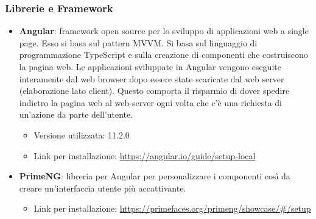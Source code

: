 \subsubsection{Librerie e Framework}

\begin{itemize}
	\item \textbf{Angular}: framework open source per lo sviluppo di applicazioni web a single page. Esso si basa sul pattern MVVM. Si basa sul linguaggio di programmazione TypeScript e sulla creazione di componenti che costruiscono la pagina web. Le applicazioni sviluppate in Angular vengono eseguite interamente dal web browser dopo essere state scaricate dal web server (elaborazione lato client). Questo comporta il risparmio di dover spedire indietro la pagina web al web-server ogni volta che c'è una richiesta di un'azione da parte dell'utente.
	\begin{itemize}
		\item Versione utilizzata: 11.2.0
		\item Link per installazione: \url{https://angular.io/guide/setup-local}
	\end{itemize}
 	\item \textbf{PrimeNG}: libreria per Angular per personalizzare i componenti così da creare un'interfaccia utente più accattivante.
	 \begin{itemize}
		\item Link per installazione: \url{https://primefaces.org/primeng/showcase/#/setup}
	\end{itemize}

	
\end{itemize}